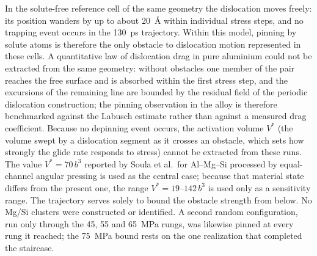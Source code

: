 In the solute-free reference cell of the same geometry the dislocation moves
freely: its position wanders by up to about 20~\AA{} within individual
stress steps, and no trapping event occurs in the 130~ps trajectory. Within
this model, pinning by solute atoms is therefore the only obstacle to
dislocation motion represented in these cells. A quantitative law of
dislocation drag in pure aluminium could not be extracted from the same
geometry: without obstacles one member of the pair reaches the free surface
and is absorbed within the first stress step, and the excursions of the
remaining line are bounded by the residual field of the periodic dislocation
construction; the pinning observation in the alloy is therefore benchmarked
against the Labusch estimate rather than against a measured drag
coefficient. Because no depinning event occurs, the activation volume $V^{*}$ (the volume swept by a dislocation segment as it crosses an obstacle, which sets how strongly the glide rate responds to stress) cannot be extracted from these runs.
The value $V^{*}=70\,b^{3}$ reported by Soula et al.\ for Al--Mg--Si
processed by equal-channel angular pressing \cite{Soula2022JALCOM} is used
as the central case; because that material state differs from the present
one, the range $V^{*}=19$--$142\,b^{3}$ \cite{CaillardMartin2003} is used
only as a sensitivity range. The trajectory serves solely to bound the
obstacle strength from below. No Mg/Si clusters were constructed or identified. A second random
configuration, run only through the 45, 55 and 65~MPa rungs, was likewise
pinned at every rung it reached; the 75~MPa bound rests on the one
realization that completed the staircase.